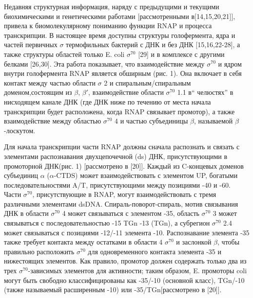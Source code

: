 \documentclass[a4paper,12pt]{article}
\begin{document}
    \par{Недавняя структурная информация, наряду с предыдущими и текущими биохимическими и генетическими работами
    [рассмотренными в[14,15,20,21]], привела к биомолекулярному пониманию функции RNAP и процесса транскрипции. В
    настоящее время доступны структуры голофермента, ядра и частей первичных \(\sigma\) термофильных бактерий с ДНК и без
    ДНК [15,16,22-28], а также структуры областей только E. coli \(\sigma^{70}\) [29] и в комплексе с другими белками
    [26,30]. Эта работа показывает, что взаимодействие между \(\sigma^{70}\) и ядром внутри голофермента RNAP является
    обширным (рис. 1). Она включает в себя контакт между частью области \(\sigma\) 2 и спиральным/спиральным
    доменом,состоящим из \(\beta\), \(\beta'\), взаимодействие области \(\sigma^{70}\) 1.1 в“ челюстях” в нисходящем
    канале ДНК (где ДНК ниже по течению от места начала транскрипции будет расположена, когда RNAP связывает промотор), а
    также взаимодействие между областью \(\sigma^{70}\) 4 и частью субъединицы \(\beta\), называемой \(\beta\)-лоскутом.}
    \par{Для начала транскрипции части RNAP должны сначала распознать и связать с элементами распознавания двухцепочечной
    (ds) ДНК, присутствующими в промоторной ДНК(рис. 1) [рассмотрено в [20]]. Каждый из C-концевых доменов субъединиц
    \(\alpha\) (\(\alpha\)-CTDS) может взаимодействовать с элементом UP, богатыми последовательностями A/T,
    присутствующими между позициями -40 и -60. Части \(\sigma^{70}\), присутствующие в RNAP, могут взаимодействовать с
    тремя различными элементами dsDNA. Спираль-поворот-спираль, мотив связывания ДНК в области \(\sigma^{70}\) 4 может
    связываться с элементом -35, область \(\sigma^{70}\) 3 может связываться с последовательностью -15 TGn -13 (TGn), а
    субрегион \(\sigma^{70}\) 2.4 может связываться с позициями -12/-11 элемента -10. Распознавание элемента -35 также
    требует контакта между остатками в области 4 \(\sigma^{70}\) и заслонкой \(\beta\), чтобы правильно расположить
    \(\sigma^{70}\) для одновременного контакта элемента -35 и нижестоящих элементов. Как правило, промотор должен
    содержать только два из трех \(\sigma^{70}\)-зависимых элементов для активности; таким образом, E. промоторы coli
    могут быть свободно классифицированы как -35/-10 (основной класс), TGn/-10 (также называемый расширенным -10) или
    -35/TGn[рассмотрено в [20]].}
\end{document}

